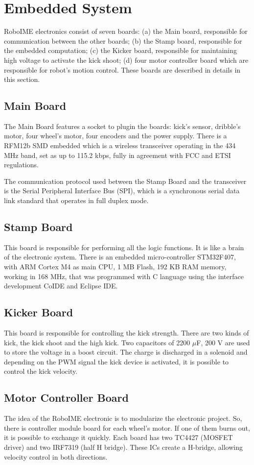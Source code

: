 \section{Embedded System}\label{emb_sys_sec}
RoboIME electronics consist of seven boards: (a) the Main board, responsible for communication between the other boards; (b) the Stamp board,
responsible  for the embedded computation; (c) the Kicker board, responsible for maintaining high voltage to activate the kick shoot;
(d) four motor controller board which are responsible for robot's motion control. These boards are described in details in this section.

\subsection{Main Board}
The Main Board features a socket to plugin the boards: kick's sensor, dribble's motor, four wheel's motor, four encoders and the power supply.
There is a RFM12b SMD embedded which is a wireless transceiver operating in the 434 MHz band, set as up to 115.2 kbps, fully in agreement
with FCC and ETSI regulations.

The communication protocol used between the Stamp Board and the transceiver is the Serial Peripheral Interface Bus (SPI), which is a synchronous
serial data link standard that operates in full duplex mode.

\subsection{Stamp Board}
This board is responsible  for performing all the logic functions. It is like a brain of the electronic system. There is an embedded micro-controller STM32F407,
with ARM Cortex M4 as main CPU, 1 MB Flash, 192 KB RAM memory, working in 168 MHz, that was programmed with C language using the  interface development
CoIDE and Eclipse IDE.

\subsection{Kicker Board}
This board is responsible for controlling the kick strength. There are two kinds of kick,
the kick shoot and the high kick. Two capacitors of 2200 $\mu$F, 200 V are used to store the
voltage in a boost circuit. The charge is discharged in a solenoid and depending on the PWM
signal the kick device is activated, it is possible to control the kick velocity.


\subsection{Motor Controller Board}
The idea of the RoboIME electronic is to modularize the electronic project. So, there
is controller module board for each wheel's motor. If one of them burns out, it is
possible to exchange it quickly. Each board has two TC4427 (MOSFET driver) and two
IRF7319 (half H bridge). These ICs create a H-bridge, allowing velocity control in
both directions.
